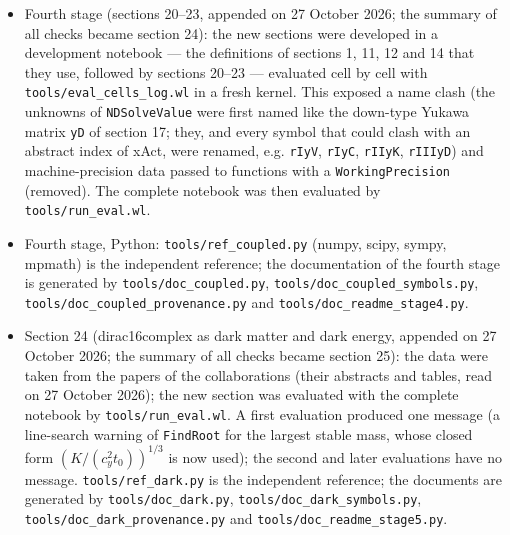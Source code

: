 \documentclass[10pt,a4paper]{article}
\begin{document}
\begin{itemize}
\item Fourth stage (sections 20–23, appended on 27 October 2026; the summary of all checks became section 24): the new sections were developed in a development notebook — the definitions of sections 1, 11, 12 and 14 that they use, followed by sections 20–23 — evaluated cell by cell with \texttt{tools/\allowbreak{}eval\_\allowbreak{}cells\_\allowbreak{}log.wl} in a fresh kernel. This exposed a name clash (the unknowns of \texttt{NDSolveValue} were first named like the down-type Yukawa matrix \texttt{yD} of section 17; they, and every symbol that could clash with an abstract index of xAct, were renamed, e.g. \texttt{rIyV}, \texttt{rIyC}, \texttt{rIIyK}, \texttt{rIIIyD}) and machine-precision data passed to functions with a \texttt{WorkingPrecision} (removed). The complete notebook was then evaluated by \texttt{tools/\allowbreak{}run\_\allowbreak{}eval.wl}.
\item Fourth stage, Python: \texttt{tools/\allowbreak{}ref\_\allowbreak{}coupled.py} (numpy, scipy, sympy, mpmath) is the independent reference; the documentation of the fourth stage is generated by \texttt{tools/\allowbreak{}doc\_\allowbreak{}coupled.py}, \texttt{tools/\allowbreak{}doc\_\allowbreak{}coupled\_\allowbreak{}symbols.py}, \texttt{tools/\allowbreak{}doc\_\allowbreak{}coupled\_\allowbreak{}provenance.py} and \texttt{tools/\allowbreak{}doc\_\allowbreak{}readme\_\allowbreak{}stage4.py}.
\item Section 24 (dirac16complex as dark matter and dark energy, appended on 27 October 2026; the summary of all checks became section 25): the data were taken from the papers of the collaborations (their abstracts and tables, read on 27 October 2026); the new section was evaluated with the complete notebook by \texttt{tools/\allowbreak{}run\_\allowbreak{}eval.wl}. A first evaluation produced one message (a line-search warning of \texttt{FindRoot} for the largest stable mass, whose closed form $(K/(c_y^2t_0))^{1/3}$ is now used); the second and later evaluations have no message. \texttt{tools/\allowbreak{}ref\_\allowbreak{}dark.py} is the independent reference; the documents are generated by \texttt{tools/\allowbreak{}doc\_\allowbreak{}dark.py}, \texttt{tools/\allowbreak{}doc\_\allowbreak{}dark\_\allowbreak{}symbols.py}, \texttt{tools/\allowbreak{}doc\_\allowbreak{}dark\_\allowbreak{}provenance.py} and \texttt{tools/\allowbreak{}doc\_\allowbreak{}readme\_\allowbreak{}stage5.py}.

\end{itemize}
\end{document}
